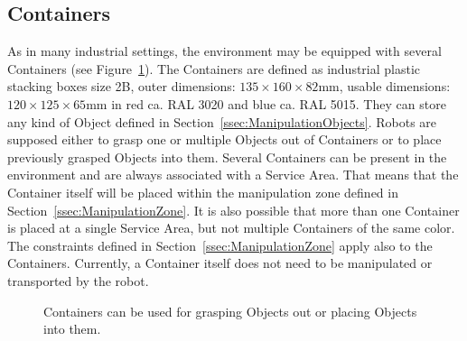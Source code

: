 \subsection{Containers}
As in many industrial settings, the \RCAW environment may be equipped with several Containers (see Figure~\ref{fig:containers}). The Containers are defined as industrial plastic stacking boxes size 2B, outer dimensions: $135 \times 160 \times 82  \si{\milli\meter}$, usable dimensions: $120 \times 125 \times 65  \si{\milli\meter}$  in red ca. RAL 3020 and blue ca. RAL 5015.
They can store any kind of Object defined in Section~\ref{ssec:ManipulationObjects}. Robots are supposed either to grasp one or multiple Objects out of Containers or to place previously grasped Objects into them. Several Containers can be present in the environment and are always associated with a Service Area. That means that the Container itself will be placed within the manipulation zone defined in Section~\ref{ssec:ManipulationZone}.
It is also possible that more than one Container is placed at a single Service Area, but not multiple Containers of the same color.
The constraints defined in Section~\ref{ssec:ManipulationZone} apply also to the Containers.
Currently, a Container itself does not need to be manipulated or transported by the robot.

\begin{figure} [h!]
	\begin{center}
		\hspace{0.05\textwidth}
	\end{center}
	\caption{Containers can be used for grasping Objects out or placing Objects into them.}
	\label{fig:containers}
\end{figure}




